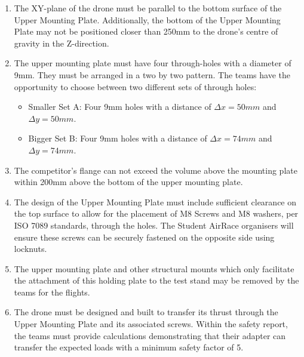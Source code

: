 \documentclass{article}
\begin{document}
\begin{enumerate}
  \item The XY-plane of the drone must be parallel to the bottom surface of the Upper Mounting Plate. Additionally, the bottom of the Upper Mounting Plate may not be positioned closer than 250mm to the drone's centre of gravity in the Z-direction.  
  \item The upper mounting plate must have four through-holes with a diameter of 9mm. They must be arranged in a two by two pattern. The teams have the opportunity to choose between two different sets of through holes:
    \begin{itemize}
      \item Smaller Set A: Four 9mm holes with a distance of ${\Delta}x=50mm$ and ${\Delta}y=50mm$.
      \item Bigger Set B: Four 9mm holes with a distance of ${\Delta}x=74mm$ and ${\Delta}y=74mm$.
    \end{itemize}
  \item The competitor's flange can not exceed the volume above the mounting plate within 200mm above the bottom of the upper mounting plate. 
  \item The design of the Upper Mounting Plate must include sufficient clearance on the top surface to allow for the placement of M8 Screws and M8 washers, per ISO 7089 standards, through the holes. The Student AirRace organisers will ensure these screws can be securely fastened on the opposite side using locknuts.
  \item The upper mounting plate and other structural mounts which only facilitate the attachment of this holding plate to the test stand may be removed by the teams for the flights. 
  \item The drone must be designed and built to transfer its thrust through the Upper Mounting Plate and its associated screws. Within the safety report, the teams must provide calculations demonstrating that their adapter can transfer the expected loads with a minimum safety factor of 5. \end{enumerate}
\end{document}
